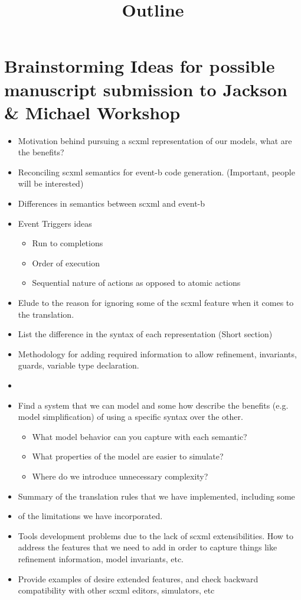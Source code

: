 \documentclass[12pt]{article}
\title{Outline}
\begin{document}
\maketitle

\section{Brainstorming Ideas for possible manuscript submission to Jackson \& Michael Workshop}

\begin{itemize}
\item Motivation behind pursuing a scxml representation of our models, what are the benefits? 
\item Reconciling scxml semantics for event-b code generation.  (Important, people will be interested)
\item Differences in semantics between scxml and event-b
\item Event Triggers ideas
	\begin{itemize}
		\item Run to completions 
		\item Order of execution
		\item Sequential nature of actions as opposed to atomic actions
	\end{itemize}	
\item Elude to the reason for ignoring some of the scxml feature when it comes to the translation.
\item List the difference in the syntax of each representation (Short section)
\item Methodology for adding required information to allow refinement, invariants,
guards, variable type declaration.
\item 
\item Find a system that we can model and some how describe the benefits (e.g. model simplification) of using a specific syntax over the other.
	\begin{itemize}
		\item What model behavior can you capture with each semantic?
		\item What properties of the model are easier to simulate?
		\item Where do we introduce unnecessary complexity?
	\end{itemize}	
\item Summary of the translation rules that we have implemented, including some
\item of the limitations we have incorporated.
\item Tools development problems due to the lack of scxml extensibilities. How to address the features that we need to add in order to capture things like refinement information, model invariants, etc.
\item Provide examples of desire extended features, and check backward compatibility with other scxml editors, simulators, etc
\end{itemize}
\end{document}
